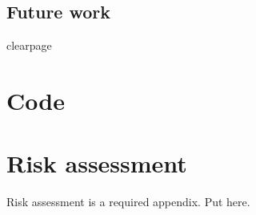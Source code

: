       \subsection{Future work}
  clearpage %
  \printbibliography[title={References},heading=bibintoc] %
  \begin{uomappendix} 
      \section{Code}
      \section{Risk assessment}
      Risk assessment is a required appendix. Put here.
  \end{uomappendix}
  
  